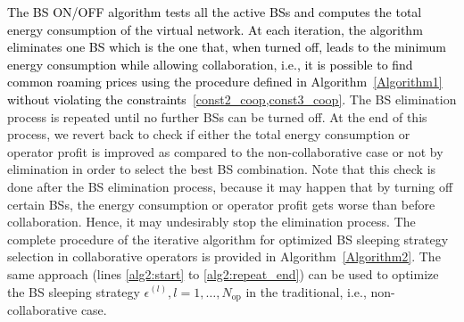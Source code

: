 \documentclass[10pt, letter, twocolumn]{IEEEtran}
\begin{document}
\textcolor{black}{The BS ON/OFF algorithm tests all the active BSs and computes the total energy consumption of the virtual network. At each iteration, the algorithm eliminates one BS which is the one that, when turned off, leads to the minimum energy consumption while allowing collaboration, i.e., it is possible to find common roaming prices using the procedure defined in Algorithm~\ref{Algorithm1} without violating the constraints~\cref{const2_coop,const3_coop}.} The BS elimination process is repeated until no further BSs can be turned off. At the end of this process, we revert back to check if either the total energy consumption or operator profit is improved as compared to the non-collaborative case or not by elimination in order to select the best BS combination. Note that this check is done after the BS elimination process, because it may happen that by turning off certain BSs, the energy consumption or operator profit gets worse than before collaboration. Hence, it may undesirably stop the elimination process. The complete procedure of the iterative algorithm for optimized BS sleeping strategy selection in collaborative operators is provided in Algorithm~\ref{Algorithm2}. The same approach (lines \ref{alg2:start} to \ref{alg2:repeat_end}) can be used to optimize the BS sleeping strategy $\epsilon^{(l)}, l= 1,\ldots, N_{\text{op}}$ in the traditional, i.e., non-collaborative case.
\end{document}
